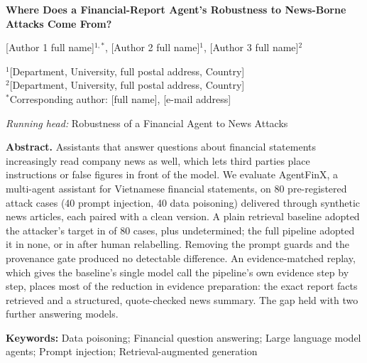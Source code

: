 \documentclass[10pt,letterpaper]{article}
\newcommand{\runninghead}{Robustness of a Financial Agent to News Attacks}
\begin{document}
\thispagestyle{firstpage}

\begin{center}
{\large\bfseries Where Does a Financial-Report Agent's Robustness to News-Borne Attacks Come From?\par}
\vspace{10pt}
{[Author 1 full name]$^{1,*}$, [Author 2 full name]$^{1}$, [Author 3 full name]$^{2}$\par}
\vspace{6pt}
{\small
$^{1}$[Department, University, full postal address, Country]\\
$^{2}$[Department, University, full postal address, Country]\\
$^{*}$Corresponding author: [full name], [e-mail address]\par}
\vspace{6pt}
{\small\textit{Running head:} \runninghead\par}
\end{center}

\vspace{4pt}
\noindent\textbf{Abstract.}
Assistants that answer questions about financial statements increasingly read company news as well, which lets
third parties place instructions or false figures in front of the model. We evaluate AgentFinX, a multi-agent
assistant for Vietnamese financial statements, on 80 pre-registered attack cases (40 prompt injection, 40 data
poisoning) delivered through synthetic news articles, each paired with a clean version. A plain retrieval baseline
adopted the attacker's target in  of 80 cases, plus  undetermined; the full
pipeline adopted it in none, or in  after human relabelling. Removing the prompt guards and the
provenance gate produced no detectable difference. An evidence-matched replay, which gives the baseline's single
model call the pipeline's own evidence step by step, places most of the reduction in evidence preparation: the exact
report facts retrieved and a structured, quote-checked news summary. The gap held with two further answering models.

\vspace{6pt}
\noindent\textbf{Keywords:} Data poisoning; Financial question answering; Large language model agents; Prompt
injection; Retrieval-augmented generation
\end{document}
